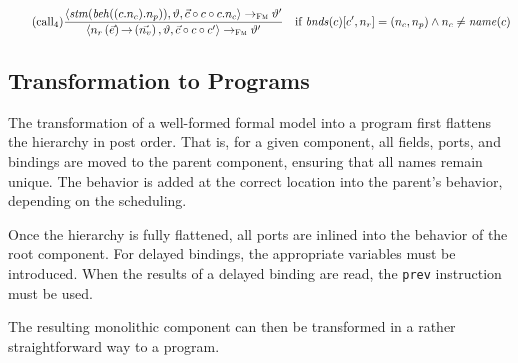\documentclass[a4paper,10pt,english]{article}
\begin{document}
\begin{equation*}
	\tag{call${}_4$}
	\dfrac
	{
		\configuration{\stmof(\behavior((\comp.\compName).\provPortName)), \varEnvFmScoped, \toList{\comp} \cons \comp \cons
		\comp.\compName}
			\stmArrowFm
		\varEnvFmScoped'
	}
	{
		\configuration{\invoke{\reqPortName}{\toList{\expr}}{\toList{\varName}}, \varEnvFmScoped, \toList{\comp} \cons \comp \cons
		\comp'}
			\stmArrowFm
		\varEnvFmScoped'
	}
	\quad \text{if } \bindings(\comp)[\comp', \reqPortName] = (\compName, \provPortName) \wedge \compName \neq \nameof(\comp)
\end{equation*}

\subsection{Transformation to \Fil Programs}
The transformation of a well-formed formal model into a \Fil program first flattens the hierarchy in post order. That is, for a
given component, all fields, ports, and bindings are moved to the parent component, ensuring that all names remain unique. The behavior
is added at the correct location into the parent's behavior, depending on the scheduling. 

Once the hierarchy is fully flattened, all ports are inlined into the behavior of the root component. For delayed bindings, the
appropriate variables must be introduced. When the results of a delayed binding are read, the \texttt{prev} instruction must be used.

The resulting monolithic component can then be transformed in a rather straightforward way to a \Fil program.
\end{document}
